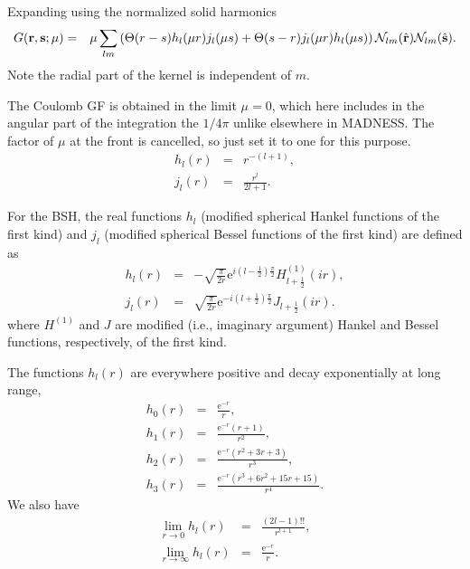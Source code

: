 \documentclass[12pt]{article}
\newcommand{\N}{\mathcal{N}}
\newcommand{\rv}{\vb{r}}
\newcommand{\sv}{\vb{s}}
\newcommand{\rhat}{\hat{\rv}}
\newcommand{\shat}{\hat{\sv}}
\begin{document}
Expanding using the normalized solid harmonics
\begin{eqnarray}
  G(\rv,\sv; \mu) & = & \mu 
  \sum_{lm}
  \left(    
  \Theta(r-s) h_l(\mu r) j_l(\mu s)
  +
  \Theta(s-r) j_l(\mu r) h_l(\mu s)
  \right)
  \N_{lm}(\rhat) \N_{lm}(\shat) .
\end{eqnarray}
Note the radial part of the kernel is independent of $m$.

The Coulomb GF is obtained in the limit $\mu=0$, which here includes in the angular part of the integration the $1/4\pi$ unlike elsewhere in MADNESS.  The factor of $\mu$ at the front is cancelled, so just set it to one for this purpose.
\begin{eqnarray}
  h_l(r) & = & r^{-(l+1)} , \\
  j_l(r) & = & \frac{r^l}{2l+1}.
\end{eqnarray}

For the BSH, the real functions $h_l$ (modified spherical Hankel functions of the first kind) and $j_l$ (modified spherical Bessel functions of the first kind) are defined as
\begin{eqnarray}
  h_l(r) & = & -\sqrt{\frac{\pi}{2r}} {\mathrm e}^{i \left(l-\frac{1}{2}\right) \frac{\pi}{2}} H_{l +\frac{1}{2}}^{\left(1\right)} \left(i r  \right) ,\\
  j_l(r) & = & \sqrt{\frac{\pi}{2r}} {\mathrm e}^{-i \left(l+\frac{1}{2}\right) \frac{\pi}{2}} J_{l +\frac{1}{2}} \left(i r  \right) .
\end{eqnarray}
where $H^{(1)}$ and $J$ are modified (i.e., imaginary argument) Hankel and Bessel functions, respectively, of the first kind.

The functions $h_l(r)$ are everywhere positive and decay exponentially at long range,
\begin{eqnarray}
  h_0(r) & = & \frac{{\mathrm e}^{-r}}{r}, \\
  h_1(r) & = & \frac{{\mathrm e}^{-r} \left(r +1\right) }{r^{2}} ,\\
  h_2(r) & = & \frac{{\mathrm e}^{-r} \left(r^{2}+3 r +3\right)}{r^{3}} ,\\
  h_3(r) & = & \frac{{\mathrm e}^{-r} \left(r^{3}+6 r^{2}+15 r +15\right)}{r^{4}} .
\end{eqnarray}
We also have
\begin{eqnarray}
  \lim_{r \rightarrow 0} h_l(r) & = & \frac{(2l-1)!!}{r^{l+1}} , \\
  \lim_{r \rightarrow \infty} h_l(r) & = & \frac{{\mathrm e}^{-r}}{r} .
\end{eqnarray}
\end{document}
